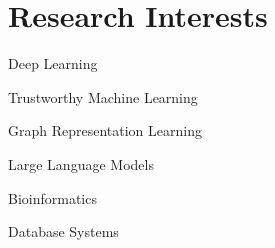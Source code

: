 
\section{Research Interests}\vspace{-1.0em}

\begin{multicols}{2}
	\begin{compactitem}
		\item {Deep Learning} 
		\item Trustworthy Machine Learning 
		\item Graph Representation Learning 
		\item Large Language Models 
		\item Bioinformatics
		\item Database Systems 
	\end{compactitem}
\end{multicols}
